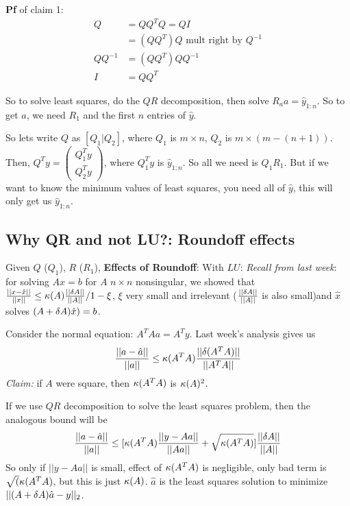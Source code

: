 \textbf{Pf} of claim 1:
\begin{align*}
  Q&=QQ^TQ= QI\\
&=(QQ^T)Q \text{ mult right by }Q^{-1}\\
QQ^{-1}&= (QQ^T)QQ^{-1}\\
I &= QQ^T
\end{align*}

So to solve least squares, do the $QR$ decomposition, then solve
$R_aa=\hat y_{1:n}$. So to get $a$, we need $R_1$ and the first $n$ entries
of $\hat y$.

So lets write $Q$ as $[Q_1 | Q_2]$, where $Q_1$ is $m\times n$, $Q_2$
is $m \times (m-(n+1))$. Then, $Q^Ty =
\begin{pmatrix}
  Q_1^Ty\\
Q^T_2y
\end{pmatrix}$, where $Q_1^Ty$ is $\hat y_{1:n}$. So all we need is
$Q_1R_1$. But if we want to know the minimum values of least squares,
you need all of $\hat y$, this will only get us $\hat y_{1:n}$.

\subsection{Why QR and not LU?: Roundoff effects}
\label{sec:roundoff}
Given $Q$ ($Q_1$), $R$ ($R_1$), \textbf{Effects of Roundoff}:
With $LU$:
\emph{Recall from last week}: for solving $Ax=b$ for $A$ $n\times n$ nonsingular, we
showed that $\frac{||x-\hat x||}{||x||} \le \kappa(A)\frac{||\delta
  A||}{||A||}/ 1-\xi$, $\xi$ very small and irrelevant ($\frac{||\delta
  A||}{||A||}$ is also small)and $\hat x$ solves
$(A+\delta A)\hat x) = b$.


Consider the normal equation: $A^TAa = A^Ty$. Last week's analysis
gives us $$\frac{||a-\hat a||}{||a||}\le \kappa(A^TA)\frac{||\delta
  (A^TA)||}{||A^TA||}$$
\emph{Claim:} if $A$ were square, then $\kappa(A^TA)$ is $\kappa(A)^2$.

If we use $QR$ decomposition to solve the least squares problem, then
the analogous bound will be
$$\frac{||a-\hat a||}{||a||}\le [\kappa(A^TA)\frac{||y-Aa||}{||Aa||} +
\sqrt{\kappa(A^TA)}]\frac{||\delta A||}{||A||}$$
So only if $||y-Aa||$ is small, effect of $\kappa(A^TA)$ is negligible,
only bad term is $\sqrt({\kappa(A^TA)}$, but this is just
$\kappa(A)$. $\hat a$ is the least squares solution to minimize
$||(A+\delta A)\hat a - y||_2$.



